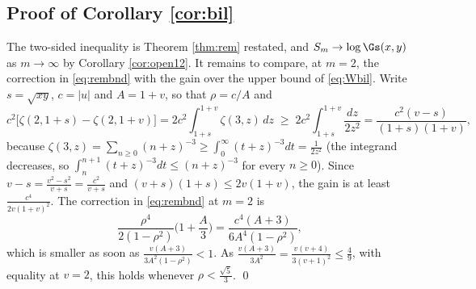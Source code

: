 \subsection{Proof of Corollary \ref{cor:bil}}
The two-sided inequality is Theorem \ref{thm:rem} restated, and
$S_{m}\to\log\Gs(x,y)$ as $m\to\infty$ by Corollary \ref{cor:open12}. It remains to
compare, at $m=2$, the correction in \eqref{eq:rembnd} with the gain over the upper
bound of \eqref{eq:Wbil}. Write $s=\sqrt{xy}$, $c=|u|$ and $A=1+v$, so that
$\rho=c/A$ and
\[
  c^{2}\big[\zeta(2,1+s)-\zeta(2,1+v)\big]
  =2c^{2}\int_{1+s}^{1+v}\zeta(3,z)\,dz
  \;\ge\;2c^{2}\int_{1+s}^{1+v}\frac{dz}{2z^{2}}
  =\frac{c^{2}(v-s)}{(1+s)(1+v)},
\]
because $\zeta(3,z)=\sum_{n\ge0}(n+z)^{-3}\ge\int_{0}^{\infty}(t+z)^{-3}dt=\frac{1}{2z^{2}}$
(the integrand decreases, so $\int_{n}^{n+1}(t+z)^{-3}dt\le(n+z)^{-3}$ for every $n\ge0$).
Since $v-s=\frac{v^{2}-s^{2}}{v+s}=\frac{c^{2}}{v+s}$ and $(v+s)(1+s)\le2v(1+v)$, the gain
is at least $\frac{c^{4}}{2v(1+v)^{2}}$. The correction in \eqref{eq:rembnd} at $m=2$ is
\[
  \frac{\rho^{4}}{2(1-\rho^{2})}\Big(1+\frac{A}{3}\Big)
  =\frac{c^{4}(A+3)}{6A^{4}(1-\rho^{2})},
\]
which is smaller as soon as $\frac{v(A+3)}{3A^{2}(1-\rho^{2})}<1$. As
$\frac{v(A+3)}{3A^{2}}=\frac{v(v+4)}{3(v+1)^{2}}\le\frac49$, with equality at $v=2$, this
holds whenever $\rho<\frac{\sqrt5}{3}$. \qed

